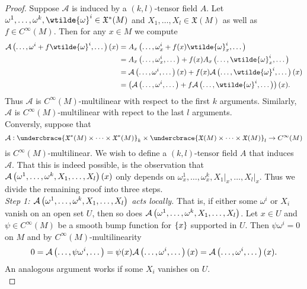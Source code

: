 \begin{proof}
	Suppose $\mathcal{A}$ is induced by a $(k,l)$-tensor field $A$. Let $\omega^1,\dots,\omega^k,\wtilde{\omega}^i \in \mathfrak{X}^*(M)$ and $X_1,\dots,X_l \in \mathfrak{X}(M)$ as well as $f \in C^\infty(M)$. Then for any $x \in M$ we compute
	\begin{align*}
		\mathcal{A}\del[1]{\dots,\omega^i + f\wtilde{\omega}^i,\dots}(x) &= A_x\del[1]{\dots,\omega^i_x + f(x)\wtilde{\omega}^i_x,\dots}\\
		&= A_x\del[1]{\dots,\omega^i_x,\dots} + f(x)A_x\del[1]{\dots,\wtilde{\omega}^i_x,\dots}\\
		&= \mathcal{A}\del[1]{\dots,\omega^i,\dots}(x) + f(x)\mathcal{A}\del[1]{\dots,\wtilde{\omega}^i,\dots}(x)\\
		&= \del[1]{\mathcal{A}\del[1]{\dots,\omega^i,\dots} + f\mathcal{A}\del[1]{\dots,\wtilde{\omega}^i,\dots}}(x).
	\end{align*}
	Thus $\mathcal{A}$ is $C^\infty(M)$-multilinear with respect to the first $k$ arguments. Similarly, $\mathcal{A}$ is $C^\infty(M)$-multilinear with repect to the last $l$ arguments.\\
Conversly, suppose that
	\begin{equation*}
		\mathcal{A}: \undercbrace{\mathfrak{X}^*(M) \times \dots \times \mathfrak{X}^*(M)}_{k} \times \undercbrace{\mathfrak{X}(M) \times \dots \times \mathfrak{X}(M)}_{l} \to C^\infty(M)
	\end{equation*}
	\noindent is $C^\infty(M)$-multilinear. We wish to define a $(k,l)$-tensor field $A$ that induces $\mathcal{A}$. That this is indeed possible, is the observation that $\mathcal{A}\del[1]{\omega^1,\dots,\omega^k,X_1,\dots,X_l}(x)$ only depends on $\omega^1_x,\dots,\omega^k_x,X_1\vert_x,\dots,X_l\vert_x$. Thus we divide the remaining proof into three steps.\\
	\emph{Step 1: $\mathcal{A}\del[1]{\omega^1,\dots,\omega^k,X_1,\dots,X_l}$ acts locally.} That is, if either some $\omega^i$ or $X_i$ vanish on an open set $U$, then so does $\mathcal{A}\del[1]{\omega^1,\dots,\omega^k,X_1,\dots,X_l}$. Let $x \in U$ and $\psi \in C^\infty(M)$ be a smooth bump function for $\cbr{x}$ supported in $U$. Then $\psi\omega^i = 0$ on $M$ and by $C^\infty(M)$-multilinearity 
	\begin{equation*}
		0 = \mathcal{A}\del[1]{\dots,\psi\omega^i,\dots} = \psi(x)\mathcal{A}\del[1]{\dots,\omega^i,\dots}(x) = \mathcal{A}\del[1]{\dots,\omega^i,\dots}(x).
	\end{equation*}
	An analogous argument works if some $X_i$ vanishes on $U$.\\

\end{proof}
